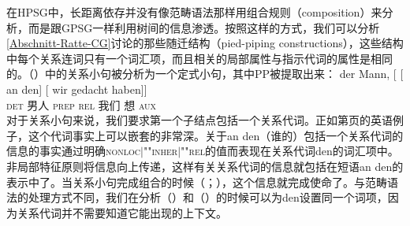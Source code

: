 在HPSG中，长距离依存并没有像范畴语法那样用组合规则（composition）来分析，而是跟GPSG一样利用树间的信息渗透。按照这样的方式，我们可以分析\ref{Abschnitt-Ratte-CG}讨论的那些随迁结构（pied-piping constructions），这些结构中每个关系连词只有一个词汇项，而且相关的局部属性与指示代词的属性是相同的。（）中的关系小句被分析为一个定式小句，其中PP被提取出来： 
\ea
\gll der Mann, [ [ an den] [ wir gedacht haben]]\\
     \textsc{det} 男人   {}        {}        \textsc{prep} \textsc{rel}  {}          我们 想 \textsc{aux}\\
\z
对于关系小句来说，我们要求第一个子结点包括一个关系代词。正如第\pageref{Beispiel-Minister}页的英语例子，这个代词事实上可以嵌套的非常深。关于an den（谁的）包括一个关系代词的信息的事实通过明确\textsc{nonloc$|$""inher$|$""rel}的值而表现在关系代词den的词汇项中。非局部特征原则将信息向上传递，这样有关关系代词的信息就包括在短语an den的表示中了。当关系小句完成组合的时候（\citealp[\S~5]{ps2}；\citealp{Sag97a}），这个信息就完成使命了。与范畴语法的处理方式不同，我们在分析（）和（）的时候可以为den设置同一个词项，因为关系代词并不需要知道它能出现的上下文。
